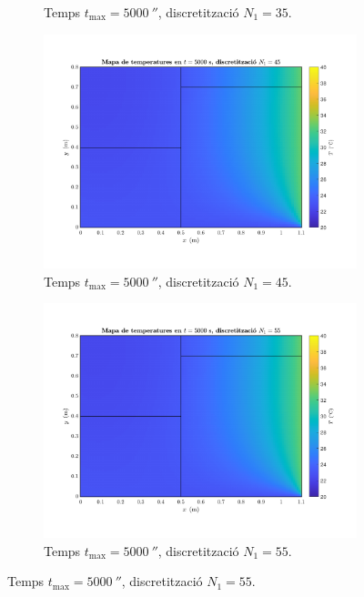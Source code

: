 \begin{figure}[ht]
\begin{subfigure}{.5\textwidth}
		\caption{Temps $t_\text{max} = 5000 \ \second$, discretització $N_1 = 35$.}
		\label{fig:malla_4}
	\end{subfigure}
	\begin{subfigure}{.5\textwidth}
		\centering
		\includegraphics[width=.95\linewidth]{imagenes/04_analisi_influencia_dades_numeriques/malla/malla_5.pdf}
		\vspace{-15pt}
		\caption{Temps $t_\text{max} = 5000 \ \second$, discretització $N_1 = 45$.}
		\label{fig:malla_5}
	\end{subfigure}%
	\begin{subfigure}{.5\textwidth}
		\centering
		\includegraphics[width=.95\linewidth]{imagenes/04_analisi_influencia_dades_numeriques/malla/malla_6.pdf}
		\vspace{-15pt}
		\caption{Temps $t_\text{max} = 5000 \ \second$, discretització $N_1 = 55$.}

\end{subfigure}
\end{figure}
